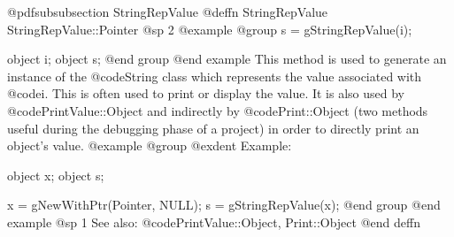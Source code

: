 @pdfsubsubsection {StringRepValue}
@deffn {StringRepValue} StringRepValue::Pointer
@sp 2
@example
@group
s = gStringRepValue(i);

object  i;
object  s;
@end group
@end example
This method is used to generate an instance of the @code{String} class
which represents the value associated with @code{i}.  This is often
used to print or display the value.  It is also used by
@code{PrintValue::Object} and indirectly by @code{Print::Object}
(two methods useful during the debugging phase of a project)
in order to directly print an object's value.
@example
@group
@exdent Example:

object  x;
object  s;

x = gNewWithPtr(Pointer, NULL);
s = gStringRepValue(x);
@end group
@end example
@sp 1
See also:  @code{PrintValue::Object, Print::Object}
@end deffn











